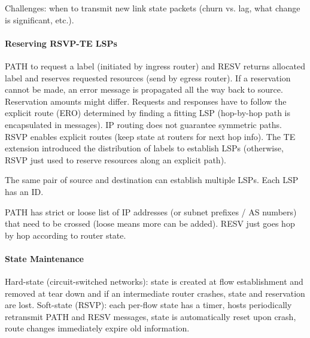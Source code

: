 Challenges: when to transmit new link state packets (churn vs. lag, what change is significant, etc.).

\paragraph{Reserving RSVP-TE LSPs}
PATH to request a label (initiated by ingress router) and RESV returns allocated label and reserves requested resources (send by egress router). If a reservation cannot be made, an error message is propagated all the way back to source. Reservation amounts might differ. Requests and responses have to follow the explicit route (ERO) determined by finding a fitting LSP (hop-by-hop path is encapsulated in messages). IP routing does not guarantee symmetric paths. RSVP enables explicit routes (keep state at routers for next hop info). The TE extension introduced the distribution of labels to establish LSPs (otherwise, RSVP just used to reserve resources along an explicit path).

The same pair of source and destination can establish multiple LSPs. Each LSP has an ID.

PATH has strict or loose list of IP addresses (or subnet prefixes / AS numbers) that need to be crossed (loose means more can be added). RESV just goes hop by hop according to router state.

\paragraph{State Maintenance}
Hard-state (circuit-switched networks): state is created at flow establishment and removed at tear down and if an intermediate router crashes, state and reservation are lost. Soft-state (RSVP): each per-flow state has a timer, hosts periodically retransmit PATH and RESV messages, state is automatically reset upon crash, route changes immediately expire old information.

